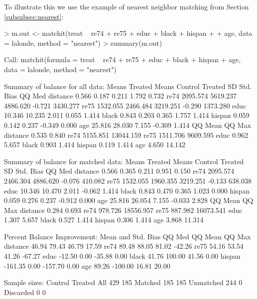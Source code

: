 \documentclass[oneside,letterpaper,titlepage]{article}
\begin{document}
  To illustrate this we use the example of nearest neighbor matching
  from Section \ref{subsubsec:nearest}:
\begin{Schunk}
\begin{Sinput}
> m.out <- matchit(treat ~ re74 + re75 + educ + black + hispan + 
+     age, data = lalonde, method = "nearest")
> summary(m.out)
\end{Sinput}
\begin{Soutput}
Call:
matchit(formula = treat ~ re74 + re75 + educ + black + hispan + 
    age, data = lalonde, method = "nearest")

Summary of balance for all data:
         Means Treated Means Control Treated SD Std. Bias   QQ Med
distance         0.566         0.187      0.211     1.792    0.732
re74          2095.574      5619.237   4886.620    -0.721 3430.277
re75          1532.055      2466.484   3219.251    -0.290 1373.280
educ            10.346        10.235      2.011     0.055    1.414
black            0.843         0.203      0.365     1.757    1.414
hispan           0.059         0.142      0.237    -0.349    0.000
age             25.816        28.030      7.155    -0.309    1.414
          QQ Mean    QQ Max
distance    0.535     0.840
re74     5155.851 13044.159
re75     1511.706  9609.595
educ        0.962     5.657
black       0.903     1.414
hispan      0.119     1.414
age         4.650    14.142


Summary of balance for matched data:
         Means Treated Means Control Treated SD Std. Bias  QQ Med
distance         0.566         0.365      0.211     0.951   0.150
re74          2095.574      2466.304   4886.620    -0.076 410.082
re75          1532.055      1960.355   3219.251    -0.133 638.038
educ            10.346        10.470      2.011    -0.062   1.414
black            0.843         0.470      0.365     1.023   0.000
hispan           0.059         0.276      0.237    -0.912   0.000
age             25.816        26.054      7.155    -0.033   2.828
         QQ Mean    QQ Max
distance   0.284     0.693
re74     978.726 18556.957
re75     887.982 16073.541
educ       1.307     5.657
black      0.527     1.414
hispan     0.306     1.414
age        3.868    11.314

Percent Balance Improvement:
         Mean and Std. Bias  QQ Med QQ Mean QQ Max
distance              46.94   79.43   46.79  17.59
re74                  89.48   88.05   81.02 -42.26
re75                  54.16   53.54   41.26 -67.27
educ                 -12.50    0.00  -35.88   0.00
black                 41.76  100.00   41.56   0.00
hispan              -161.35    0.00 -157.70   0.00
age                   89.26 -100.00   16.81  20.00

Sample sizes:
          Control Treated
All           429     185
Matched       185     185
Unmatched     244       0
Discarded       0       0
\end{Soutput}
\end{Schunk}
\end{document}
